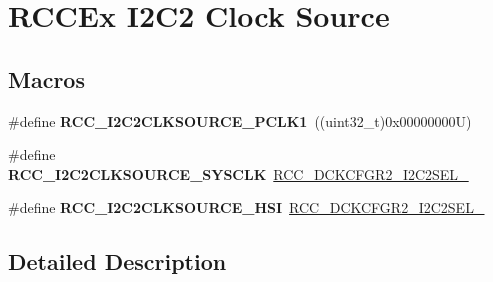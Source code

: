 \hypertarget{group___r_c_c_ex___i2_c2___clock___source}{}\section{R\+C\+C\+Ex I2\+C2 Clock Source}
\label{group___r_c_c_ex___i2_c2___clock___source}
\subsection*{Macros}
\begin{DoxyCompactItemize}
\item 
\mbox{\label{group___r_c_c_ex___i2_c2___clock___source_ga8aad93752b3933f771ef44ad53afd6b7}} 
\#define {\bfseries R\+C\+C\+\_\+\+I2\+C2\+C\+L\+K\+S\+O\+U\+R\+C\+E\+\_\+\+P\+C\+L\+K1}~((uint32\+\_\+t)0x00000000\+U)
\item 
\mbox{\label{group___r_c_c_ex___i2_c2___clock___source_ga6c973611f0026e17e06e140f708168d5}} 
\#define {\bfseries R\+C\+C\+\_\+\+I2\+C2\+C\+L\+K\+S\+O\+U\+R\+C\+E\+\_\+\+S\+Y\+S\+C\+LK}~\mbox{\hyperlink{group___peripheral___registers___bits___definition_ga4f2d189947980d23e9988c5d6c19964a}{R\+C\+C\+\_\+\+D\+C\+K\+C\+F\+G\+R2\+\_\+\+I2\+C2\+S\+E\+L\+\_}}
\item 
\mbox{\label{group___r_c_c_ex___i2_c2___clock___source_gab2d1849bb1ec2df29cab79843441e3cc}} 
\#define {\bfseries R\+C\+C\+\_\+\+I2\+C2\+C\+L\+K\+S\+O\+U\+R\+C\+E\+\_\+\+H\+SI}~\mbox{\hyperlink{group___peripheral___registers___bits___definition_ga0f520719b6182c432a98f3b4ee57cfcf}{R\+C\+C\+\_\+\+D\+C\+K\+C\+F\+G\+R2\+\_\+\+I2\+C2\+S\+E\+L\+\_}}
\end{DoxyCompactItemize}


\subsection{Detailed Description}

